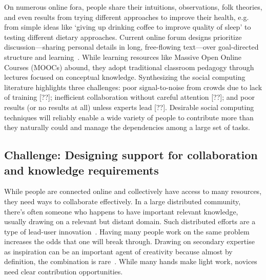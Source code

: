 On numerous online fora, people share their intuitions, observations, folk theories, and even results from trying different approaches to improve their health, e.g. from simple ideas like ‘giving up drinking coffee to improve quality of sleep’ to testing different dietary approaches. 
Current online forum designs prioritize discussion---sharing personal details in long, free-flowing text---over goal-directed structure and learning~\cite{Thomas2002}. While learning resources like Massive Open Online Courses (MOOCs) abound, they adopt traditional classroom pedagogy through lectures focused on conceptual knowledge. Synthesizing the social computing literature highlights three challenges: poor signal-to-noise from crowds due 
to lack of training [??]; inefficient collaboration without careful attention [??]; and poor results (or no results at all) unless experts lead [??]. Desirable social computing techniques will reliably enable a wide variety of people to contribute more than they naturally could and manage the dependencies among a large set of tasks. 





\subsection{Challenge: Designing support for collaboration and knowledge requirements}
While people are connected online and collectively have access to many resources, they need ways to collaborate effectively. 
In a large distributed community, there’s often someone who happens to 
have important relevant knowledge, usually drawing on a relevant but 
distant domain. Such distributed efforts are a type of lead-user innovation~\cite{VonHippel2005a}. 
Having many people work on the same problem increases the odds that 
one will break through. Drawing on secondary expertise as inspiration can
 be an important agent of creativity because almost by definition, the 
combination is rare~\cite{Boden2004}. While many hands make light work, novices need clear contribution opportunities. 


